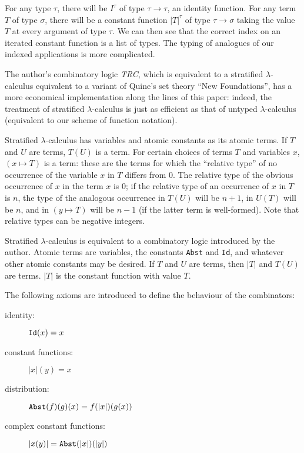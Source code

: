 \documentclass{article}
\begin{document}
For any type $\tau$, there will be $I^{\tau}$ of type $\tau
\rightarrow \tau$, an identity function.  For any term $T$ of type
$\sigma$, there will be a constant function $|T|^\tau$ of type $\tau
\rightarrow \sigma$ taking the value $T$ at every argument of type
$\tau$.  We can then see that the correct index on an iterated
constant function is a list of types.  The typing of analogues of our
indexed applications is more complicated.

The author's combinatory logic {\em TRC\/}, which is equivalent to a
stratified $\lambda$-calculus equivalent to a variant of Quine's set
theory ``New Foundations'', has a more economical implementation along
the lines of this paper: indeed, the treatment of stratified
$\lambda$-calculus is just as efficient as that of untyped $\lambda$-calculus
(equivalent to our scheme of function notation).

Stratified $\lambda$-calculus has variables and atomic constants as
its atomic terms.  If $T$ and $U$ are terms, $T(U)$ is a term.  For
certain choices of terms $T$ and variables $x$, $(x \mapsto T)$ is a
term: these are the terms for which the ``relative type'' of no
occurrence of the variable $x$ in $T$ differs from 0.  The relative
type of the obvious occurrence of $x$ in the term $x$ is 0; if the
relative type of an occurrence of $x$ in $T$ is $n$, the type of the
analogous occurrence in $T(U)$ will be $n+1$, in $U(T)$ will be $n$,
and in $(y \mapsto T)$ will be $n-1$ (if the latter term is
well-formed).  Note that relative types can be negative integers.

Stratified $\lambda$-calculus is equivalent to a combinatory logic
introduced by the author.  Atomic terms are variables, the constants
{\tt Abst} and {\tt Id}, and whatever other atomic constants may be
desired.  If $T$ and $U$ are terms, then $|T|$ and $T(U)$ are terms.
$|T|$ is the constant function with value $T$.

The following axioms are introduced to define the behaviour of the
combinators:

\begin{description}

\item[identity:]  ${\tt Id}(x) = x$

\item[constant functions:]  $|x|(y) = x$

\item[distribution:]  ${\tt Abst}(f)(g)(x) = f(|x|)(g(x))$

\item[complex constant functions:]  $|x(y)| = {\tt Abst}(|x|)(|y|)$

\end{description}
\end{document}
